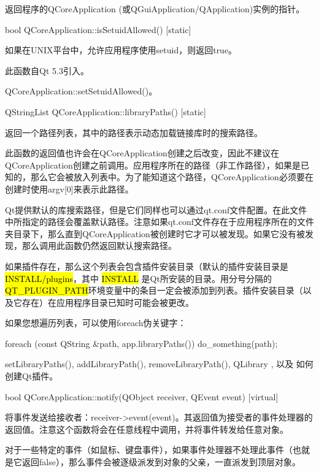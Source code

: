 返回程序的QCoreApplication (或QGuiApplication/QApplication)实例的指针。

bool QCoreApplication::isSetuidAllowed() [static]

如果在UNIX平台中，允许应用程序使用setuid，则返回true。

此函数自Qt 5.3引入。


\begin{seeAlso}
QCoreApplication::setSetuidAllowed()。
\end{seeAlso}

QStringList QCoreApplication::libraryPaths() [static]

返回一个路径列表，其中的路径表示动态加载链接库时的搜索路径。

此函数的返回值也许会在QCoreApplication创建之后改变，因此不建议在QCoreApplication创建之前调用。应用程序所在的路径（非工作路径），如果是已知的，那么它会被放入列表中。为了能知道这个路径，QCoreApplication必须要在创建时使用argv[0]来表示此路径。

Qt提供默认的库搜索路径，但是它们同样也可以通过qt.conf文件配置。在此文件中所指定的路径会覆盖默认路径。注意如果qt.conf文件存在于应用程序所在的文件夹目录下，那么直到QCoreApplication被创建时它才可以被发现。如果它没有被发现，那么调用此函数仍然返回默认搜索路径。

如果插件存在，那么这个列表会包含插件安装目录（默认的插件安装目录是
\hl{INSTALL/plugins}，其中 \hl{INSTALL} 是Qt所安装的目录。用分号分隔的\hl{QT\_PLUGIN\_PATH}环境变量中的条目一定会被添加到列表。插件安装目录（以及它存在）在应用程序目录已知时可能会被更改。

如果您想遍历列表，可以使用foreach伪关键字：

\begin{cppcode}
foreach (const QString &path, app.libraryPaths())
    do_something(path);
\end{cppcode}



\begin{seeAlso}
 setLibraryPaths(), addLibraryPath(), removeLibraryPath(), QLibrary , 以及 如何创建Qt插件。
\end{seeAlso}

bool QCoreApplication::notify(QObject receiver, QEvent event) [virtual]

将事件发送给接收者：receiver->event(event)。其返回值为接受者的事件处理器的返回值。注意这个函数将会在任意线程中调用，并将事件转发给任意对象。

对于一些特定的事件（如鼠标、键盘事件），如果事件处理器不处理此事件（也就是它返回false），那么事件会被逐级派发到对象的父亲，一直派发到顶层对象。

